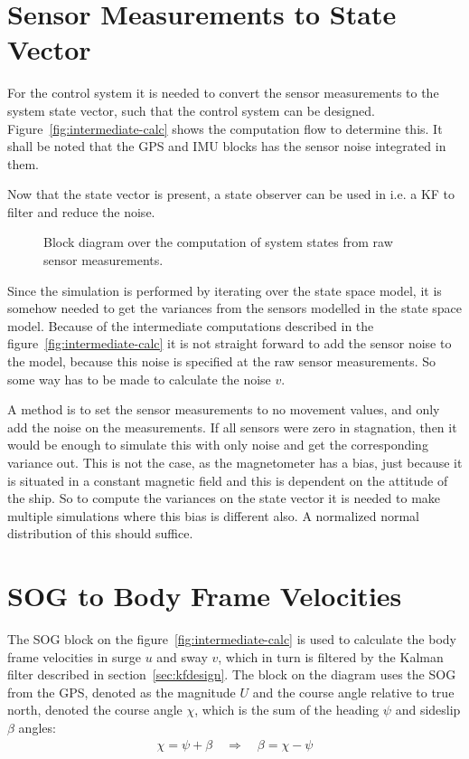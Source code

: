 \section{Sensor Measurements to State Vector}
For the control system it is needed to convert the sensor measurements
to the system state vector, such that the control system can be
designed. Figure~\vref{fig:intermediate-calc} shows the computation
flow to determine this. It shall be noted that the \ac{GPS} and
\ac{IMU} blocks has the sensor noise integrated in them.

Now that the state vector is present, a state observer can be used
in i.e. a \ac{KF} to filter and reduce the noise.

\begin{figure}
	\centering
	
	\caption{Block diagram over the computation of system states from
	raw sensor measurements.}
	\label{fig:intermediate-calc}
\end{figure}

Since the simulation is performed by iterating over the state space
model, it is somehow needed to get the variances from the sensors
modelled in the state space model. Because of the intermediate
computations described in the figure~\vref{fig:intermediate-calc} it
is not straight forward to add the sensor noise to the model, because
this noise is specified at the raw sensor measurements. So some way
has to be made to calculate the noise $v$.

A method is to set the sensor measurements to no movement values, and
only add the noise on the measurements. If all sensors were zero in
stagnation, then it would be enough to simulate this with only noise and
get the corresponding variance out. This is not the case, as the
magnetometer has a bias, just because it is situated in a constant
magnetic field and this is dependent on the attitude of the ship. So
to compute the variances on the state vector it is needed to make
multiple simulations where this bias is different also. A normalized
normal distribution of this should suffice. 

\section{\acs{SOG} to Body Frame Velocities}
The \acl{SOG} block on the figure~\vref{fig:intermediate-calc} is used to calculate the body frame velocities in surge $u$ and sway $v$, which in turn is filtered by the Kalman filter described in section~\vref{sec:kfdesign}. The block on the diagram uses the \ac{SOG} from the \ac{GPS}, denoted as the magnitude $U$ and the course angle relative to true north, denoted the course angle $\chi$, which is the sum of the heading $\psi$ and sideslip $\beta$ angles:
\begin{align}
\chi = \psi + \beta \quad \Rightarrow  \quad \beta = \chi - \psi
\label{eq:angles}
\end{align}


